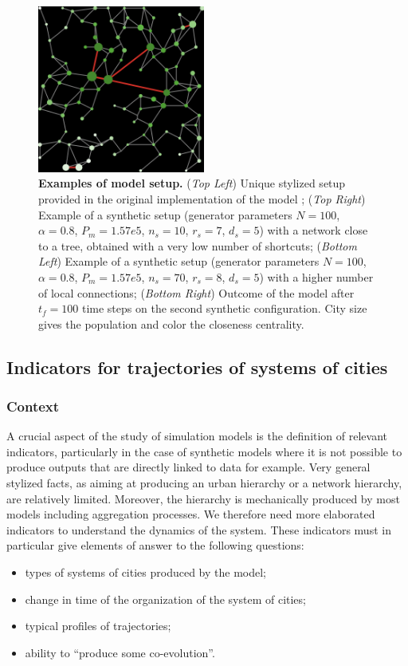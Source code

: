 \documentclass[graybox]{svmult}
\begin{document}
\begin{figure}
	\includegraphics[width=0.49\textwidth]{setup_synth_1_tick100.png}
	\caption{\textbf{Examples of model setup.} (\textit{Top Left}) Unique stylized setup provided in the original implementation of the model \cite{schmitt2014modelisation}; (\textit{Top Right}) Example of a synthetic setup (generator parameters $N=100$, $\alpha=0.8$, $P_m =1.57e5$, $n_s = 10$, $r_s=7$, $d_s = 5$) with a network close to a tree, obtained with a very low number of shortcuts; (\textit{Bottom Left}) Example of a synthetic setup (generator parameters $N=100$, $\alpha=0.8$, $P_m =1.57e5$, $n_s = 70$, $r_s=8$, $d_s = 5$) with a higher number of local connections; (\textit{Bottom Right}) Outcome of the model after $t_f = 100$ time steps on the second synthetic configuration. City size gives the population and color the closeness centrality.\label{fig:exsetup}}
\end{figure}



\subsection{Indicators for trajectories of systems of cities}

\subsubsection{Context}

A crucial aspect of the study of simulation models is the definition of relevant indicators, particularly in the case of synthetic models where it is not possible to produce outputs that are directly linked to data for example. Very general stylized facts, as aiming at producing an urban hierarchy or a network hierarchy, are relatively limited. Moreover, the hierarchy is mechanically produced by most models including aggregation processes. We therefore need more elaborated indicators to understand the dynamics of the system. These indicators must in particular give elements of answer to the following questions:
\begin{itemize}
	\item types of systems of cities produced by the model;
	\item change in time of the organization of the system of cities;
	\item typical profiles of trajectories;
	\item ability to ``produce some co-evolution''.
\end{itemize}
\end{document}
